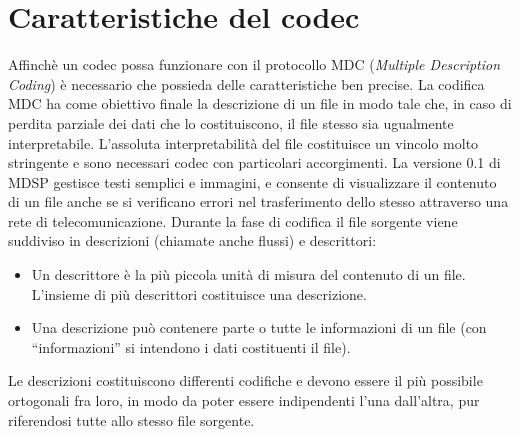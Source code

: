 \section{Caratteristiche del codec}
Affinch\`e un codec possa funzionare con il protocollo MDC (\emph{Multiple Description Coding}) è necessario che possieda delle caratteristiche ben precise. La codifica MDC ha come obiettivo finale la descrizione di un file in modo tale che, in caso di perdita parziale dei dati che lo costituiscono, il file stesso sia ugualmente interpretabile. L'assoluta interpretabilit\`a del file costituisce un vincolo molto stringente e sono necessari codec con particolari accorgimenti. La versione 0.1 di MDSP gestisce testi semplici e immagini, e consente di visualizzare il contenuto di un file anche se si verificano errori nel trasferimento dello stesso attraverso una rete di telecomunicazione. Durante la fase di codifica il file sorgente viene suddiviso in descrizioni (chiamate anche flussi) e descrittori:
\begin{itemize}
 \item Un descrittore \`e la pi\`u piccola unit\`a di misura del contenuto di un file. L'insieme di pi\`u descrittori costituisce una descrizione.
 \item Una descrizione pu\`o contenere parte o tutte le informazioni di un file (con ``informazioni'' si intendono i dati costituenti il file).
\end{itemize}
Le descrizioni costituiscono differenti codifiche e devono essere il più possibile ortogonali fra loro, in modo da poter essere indipendenti l'una dall'altra, pur riferendosi tutte allo stesso file sorgente.

